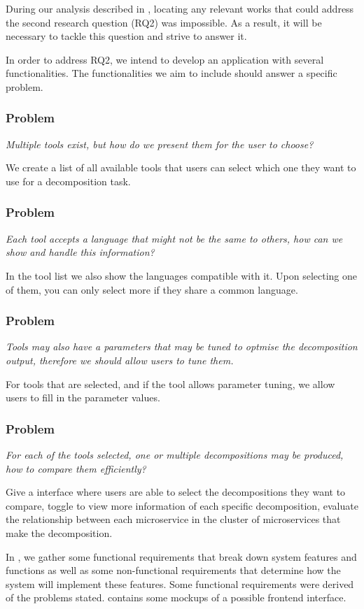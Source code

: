During our analysis described in , locating any
relevant works that could address the second research question (RQ2) was
impossible. As a result, it will be necessary to tackle this question and
strive to answer it.

In order to address RQ2, we intend to develop an application with several
functionalities. The functionalities we aim to include should answer a specific
problem.

\subsubsection*{Problem}

\textit{Multiple tools exist, but how do we present them for the user to
choose?}

We create a list of all available tools that users can select which one they
want to use for a decomposition task.

\subsubsection*{Problem}

\textit{Each tool accepts a language that might not be the same to others, how
can we show and handle this information?}

In the tool list we also show the languages compatible with it. Upon selecting
one of them, you can only select more if they share a common language.

\subsubsection*{Problem}

\textit{Tools may also have a parameters that may be tuned to optmise the
decomposition output, therefore we should allow users to tune them.}

For tools that are selected, and if the tool allows parameter tuning, we allow
users to fill in the parameter values.

\subsubsection*{Problem}

\textit{For each of the tools selected, one or multiple decompositions may be
produced, how to compare them efficiently?}

Give a interface where users are able to select the decompositions they want to
compare, toggle to view more information of each specific decomposition,
evaluate the relationship between each microservice in the cluster of
microservices that make the decomposition.

In , we gather some functional requirements that break
down system features and functions as well as some non-functional requirements
that determine how the system will implement these features. Some functional
requirements were derived of the problems stated. 
contains some mockups of a possible frontend interface.
